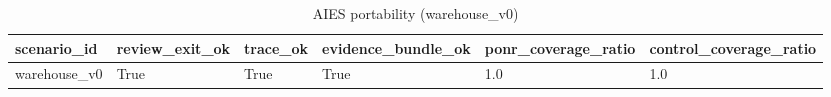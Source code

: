 \begin{table}[t]
\centering
\begin{tabular}{l | l | l | l | l | l}
\hline
scenario_id & review_exit_ok & trace_ok & evidence_bundle_ok & ponr_coverage_ratio & control_coverage_ratio \\
\hline
warehouse_v0 & True & True & True & 1.0 & 1.0 \\
\hline
\end{tabular}
\caption{AIES portability (warehouse\_v0)}
\end{table}

